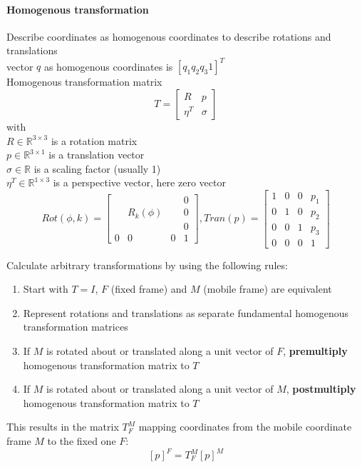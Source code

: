 \documentclass[12pt]{article}
\newcommand{\R}{\mathbb{R}}
\begin{document}
	\paragraph{Homogenous transformation} Describe coordinates as homogenous coordinates to describe rotations and translations\\
	vector $q$ as homogenous coordinates is $[q_{1} q_{2} q_{3} 1]^T$\\
	Homogenous transformation matrix
	\begin{equation}
	T = 
	\begin{bmatrix}
	R & p\\
	\eta^T & \sigma
	\end{bmatrix}
	\end{equation}
	with\\
	$R \in \R^{3 \times 3}$ is a rotation matrix\\
	$p \in \R^{3 \times 1}$ is a translation vector\\
	$\sigma \in \R$ is a scaling factor (usually 1)\\
	$\eta^T \in \R^{1 \times 3}$ is a perspective vector, here zero vector	\begin{equation}
	Rot(\phi, k) = 
	\begin{bmatrix}
	& & & 0\\
	& R_{k}(\phi) & & 0\\
	& & & 0\\
	0 & 0 & 0 & 1
	\end{bmatrix}, 
	Tran(p) = 
	\begin{bmatrix}
	1 & 0 & 0 & p_{1}\\
	0 & 1 & 0 & p_{2}\\
	0 & 0 & 1 & p_{3}\\
	0 & 0 & 0 & 1
	\end{bmatrix}
	\end{equation}
	
	Calculate arbitrary transformations by using the following rules:
	\begin{enumerate}
		\item Start with $T = I$, $F$ (fixed frame) and $M$ (mobile frame) are equivalent
		\item Represent rotations and translations as separate fundamental homogenous transformation matrices
		\item If $M$ is rotated about or translated along a unit vector of $F$, \textbf{premultiply} homogenous transformation matrix to $T$
		\item If $M$ is rotated about or translated along a unit vector of $M$, \textbf{postmultiply} homogenous transformation matrix to $T$
	\end{enumerate}
	This results in the matrix $T_F^M$ mapping coordinates from the mobile coordinate frame $M$ to the fixed one $F$:
	$$[p]^F = T_F^M [p]^M$$
	
\end{document}
